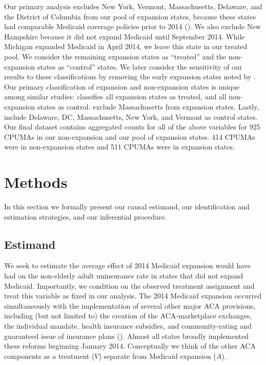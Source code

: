 \documentclass[12pt]{article}
\begin{document}
Our primary analysis excludes New York, Vermont, Massachusetts, Delaware, and the District of Columbia from our pool of expansion states, because these states had comparable Medicaid coverage policies prior to 2014 (\cite{kaestner2017effects}). We also exclude New Hampshire because it did not expand Medicaid until September 2014. While Michigan expanded Medicaid in April 2014, we leave this state in our treated pool. We consider the remaining expansion states as ``treated'' and the non-expansion states as ``control'' states. We later consider the sensitivity of our results to these classifications by removing the early expansion states noted by \cite{frean2017premium}. Our primary classification of expansion and non-expansion states is unique among similar studies: \cite{courtemanche2017early} classifies all expansion states as treated, and all non-expansion states as control. \cite{frean2017premium} exclude Massachusetts from expansion states. Lastly, \cite{kaestner2017effects} include Delaware, DC, Massachusetts, New York, and Vermont as control states. Our final dataset contains aggregated counts for all of the above variables for 925 CPUMAs in our non-expansion and our pool of expansion states. 414 CPUMAs were in non-expansion states and 511 CPUMAs were in expansion states.

\section{Methods}
\label{sec:methods}

In this section we formally present our causal estimand, our identification and estimation strategies, and our inferential procedure.

\subsection{Estimand}

We seek to estimate the average effect of 2014 Medicaid expansion would have had on the non-elderly adult uninsurance rate in states that did not expand Medicaid. Importantly, we condition on the observed treatment assignment and treat this variable as fixed in our analysis. The 2014 Medicaid expansion occurred simultaneously with the implementation of several other major ACA provisions, including (but not limited to) the creation of the ACA-marketplace exchanges, the individual mandate, health insurance subsidies, and community-rating and guaranteed issue of insurance plans (\cite{courtemanche2017early}). Almost all states broadly implemented these reforms beginning January 2014. Conceptually we think of the other ACA components as a treatment ($V$) separate from Medicaid expansion ($A$).
\end{document}
